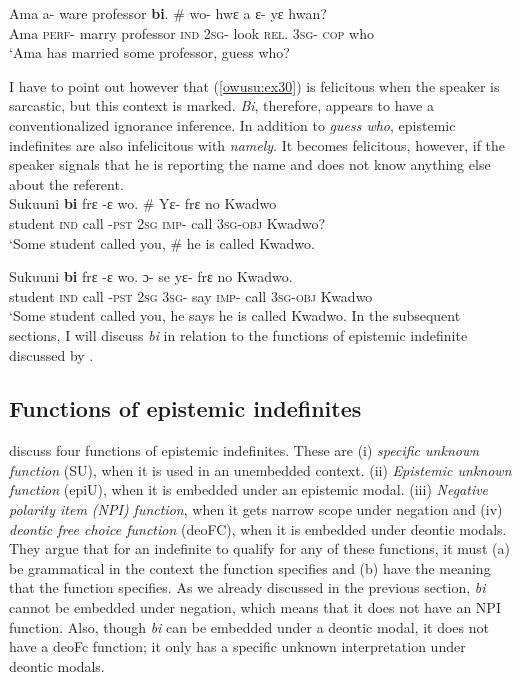 \documentclass[output=paper,modfonts,nonflat,draftmode]{langsci/langscibook}
\begin{document}
\ex \label{owusu:ex31}
\gll  Ama a- ware professor \textbf{bi}. \# wo- hwε a ε- yε hwan?\\
Ama \textsc{perf}- marry professor \textsc{ind} {} \textsc{2sg}- look  \textsc{rel}. \textsc{3sg}- \textsc{cop} who\\
\glt `Ama has married some professor, guess who?
\z\z 

I have to point out however that (\ref{owusu:ex30}) is felicitous when the speaker is sarcastic, but this context is marked. \emph{Bi}, therefore, appears to have a conventionalized ignorance inference. In addition to \emph{guess who}, epistemic indefinites are also infelicitous with \emph{namely}. It becomes felicitous, however, if the speaker signals that he is reporting the name and does not know anything else about the referent. 
\ea {}\\
\ea\label{owusu:ex32}
 \gll Sukuuni \textbf{bi} frε -ε wo. \# Yε- frε no Kwadwo\\
student \textsc{ind} call -\textsc{pst}  \textsc{2sg} {} \textsc{imp}- call  3\textsc{sg}-\textsc{obj} Kwadwo? \\
    
\glt `Some student called you, \# he is called Kwadwo.

\ex \label{owusu:ex33}
\gll  Sukuuni \textbf{bi} frε -ε wo. ɔ- se yε- frε no Kwadwo.\\
 student \textsc{ind} call -\textsc{pst}  \textsc{2sg} \textsc{3sg}- say \textsc{imp}- call  \textsc{3sg}-\textsc{obj} Kwadwo\\
\glt `Some student called you, he says he is called Kwadwo.
\z\z In the subsequent sections, I will discuss \emph{bi} in relation to the functions of epistemic indefinite discussed by  \citet{AloniPort2015}.

\subsection{Functions of epistemic indefinites}

\citet{AloniPort2015} discuss four functions of epistemic indefinites. These are (i) \emph{specific unknown function} (SU), when it is used in an unembedded context. (ii) \emph{Epistemic unknown function} (epiU), when it is embedded under an epistemic modal. (iii) \emph{Negative polarity item (NPI) function}, when it gets narrow scope under negation and (iv) \emph{deontic free choice function} (deoFC), when it is embedded under deontic modals. They argue that for an indefinite to qualify for any of these functions, it must (a) be grammatical in the context the function specifies and (b) have the meaning that the function specifies. As we already discussed in the previous section, \emph{bi} cannot be embedded under negation, which means that it does not have an NPI function. Also, though \emph{bi} can be embedded under a deontic modal, it does not have a deoFc function; it only has a specific unknown interpretation under deontic modals. 
\end{document}
